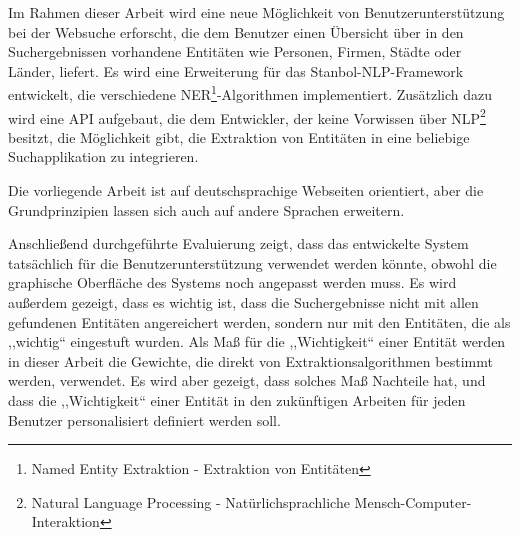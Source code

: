 Im Rahmen dieser Arbeit wird eine neue Möglichkeit von Benutzerunterstützung bei der Websuche erforscht, die dem Benutzer einen Übersicht über in den Suchergebnissen vorhandene Entitäten wie Personen, Firmen, Städte oder Länder, liefert. Es wird eine Erweiterung für das Stanbol-NLP-Framework entwickelt, die verschiedene NER\footnote{Named Entity Extraktion - Extraktion von Entitäten}-Algorithmen implementiert. Zusätzlich dazu wird eine API aufgebaut, die dem Entwickler, der keine Vorwissen über NLP\footnote{Natural Language Processing - Natürlichsprachliche Mensch-Computer-Interaktion} besitzt, die Möglichkeit gibt, die Extraktion von Entitäten in eine beliebige Suchapplikation zu integrieren. 

Die vorliegende Arbeit ist auf deutschsprachige Webseiten orientiert, aber die Grundprinzipien lassen sich auch auf andere Sprachen erweitern.

Anschließend durchgeführte Evaluierung zeigt, dass das entwickelte System tatsächlich für die Benutzerunterstützung verwendet werden könnte, obwohl die graphische Oberfläche des Systems noch angepasst werden muss. Es wird außerdem gezeigt, dass es wichtig ist, dass die Suchergebnisse nicht mit allen gefundenen Entitäten angereichert werden, sondern nur mit den Entitäten, die als ,,wichtig`` eingestuft wurden. Als Maß für die ,,Wichtigkeit`` einer Entität werden in dieser Arbeit die Gewichte, die direkt von Extraktionsalgorithmen bestimmt werden, verwendet. Es wird aber gezeigt, dass solches Maß Nachteile hat, und dass die ,,Wichtigkeit`` einer Entität in den zukünftigen Arbeiten für jeden Benutzer personalisiert definiert werden soll.